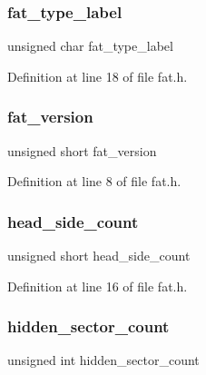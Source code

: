 \subsubsection{\texorpdfstring{fat\+\_\+type\+\_\+label}{fat\_type\_label}}
{\footnotesize\ttfamily unsigned char fat\+\_\+type\+\_\+label}



Definition at line 18 of file fat.\+h.

\mbox{\label{a00158_ab4a262a3a624c702e31a66fd3602a60d_ab4a262a3a624c702e31a66fd3602a60d}} 
\subsubsection{\texorpdfstring{fat\+\_\+version}{fat\_version}}
{\footnotesize\ttfamily unsigned short fat\+\_\+version}



Definition at line 8 of file fat.\+h.

\mbox{\label{a00158_a33263a0ce9b20cca4a493c961a5ade52_a33263a0ce9b20cca4a493c961a5ade52}} 
\subsubsection{\texorpdfstring{head\+\_\+side\+\_\+count}{head\_side\_count}}
{\footnotesize\ttfamily unsigned short head\+\_\+side\+\_\+count}



Definition at line 16 of file fat.\+h.

\mbox{\label{a00158_a0c59c66983eef3ab335aed301b09c3ba_a0c59c66983eef3ab335aed301b09c3ba}} 
\subsubsection{\texorpdfstring{hidden\+\_\+sector\+\_\+count}{hidden\_sector\_count}}
{\footnotesize\ttfamily unsigned int hidden\+\_\+sector\+\_\+count}




